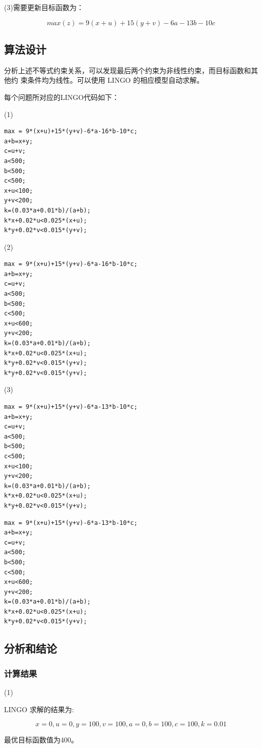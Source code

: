 \documentclass{article}
\begin{document}
(3)需要更新目标函数为：

$$max(z)=9(x+u)+15(y+v)-6a-13b-10c$$


\subsection{算法设计}

分析上述不等式约束关系，可以发现最后两个约束为非线性约束，而目标函数和其他约 束条件均为线性。可以使用 LINGO 的相应模型自动求解。

每个问题所对应的LINGO代码如下：

(1)
\begin{lstlisting}
max = 9*(x+u)+15*(y+v)-6*a-16*b-10*c;
a+b=x+y;
c=u+v;
a<500;
b<500;
c<500;
x+u<100;
y+v<200;
k=(0.03*a+0.01*b)/(a+b);
k*x+0.02*u<0.025*(x+u);
k*y+0.02*v<0.015*(y+v);
\end{lstlisting}

(2)
\begin{lstlisting}
max = 9*(x+u)+15*(y+v)-6*a-16*b-10*c;
a+b=x+y;
c=u+v;
a<500;
b<500;
c<500;
x+u<600;
y+v<200;
k=(0.03*a+0.01*b)/(a+b);
k*x+0.02*u<0.025*(x+u);
k*y+0.02*v<0.015*(y+v);
k*y+0.02*v<0.015*(y+v);
\end{lstlisting}

(3)
\begin{lstlisting}
max = 9*(x+u)+15*(y+v)-6*a-13*b-10*c;
a+b=x+y;
c=u+v;
a<500;
b<500;
c<500;
x+u<100;
y+v<200;
k=(0.03*a+0.01*b)/(a+b);
k*x+0.02*u<0.025*(x+u);
k*y+0.02*v<0.015*(y+v);
\end{lstlisting}

\begin{lstlisting}
max = 9*(x+u)+15*(y+v)-6*a-13*b-10*c;
a+b=x+y;
c=u+v;
a<500;
b<500;
c<500;
x+u<600;
y+v<200;
k=(0.03*a+0.01*b)/(a+b);
k*x+0.02*u<0.025*(x+u);
k*y+0.02*v<0.015*(y+v);
\end{lstlisting}

\subsection{分析和结论}

\subsubsection{计算结果}

(1)

LINGO 求解的结果为:

$$x=0,u=0,y=100,v=100,a=0,b=100,c=100,k=0.01$$

最优目标函数值为400。
\end{document}
